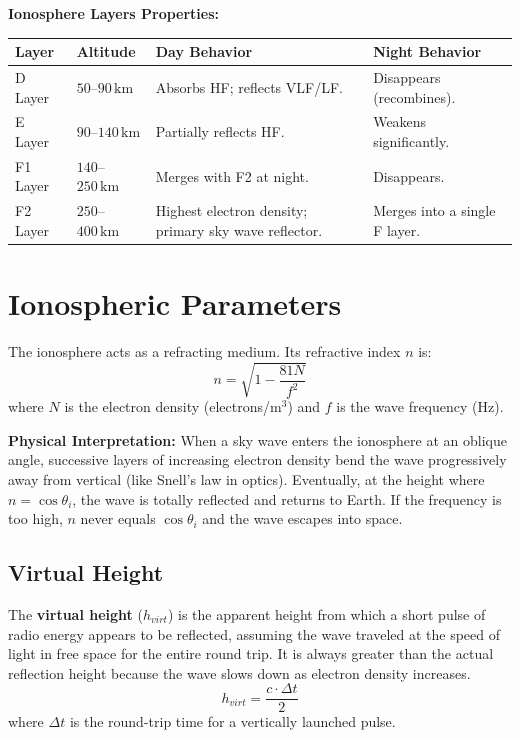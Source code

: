 \documentclass[12pt,a4paper]{article}
\renewcommand{\arraystretch}{1.45}
\begin{document}
\par\noindent
\textbf{Ionosphere Layers Properties:}\par\noindent
{\renewcommand{\arraystretch}{1.45}%
\begin{tabularx}{\linewidth}{|B{1.5cm}|B{2.2cm}|Y|Y|}
\hline
\textbf{Layer} & \textbf{Altitude} & \textbf{Day Behavior} & \textbf{Night Behavior} \\
\hline
D Layer & $50$–$90\,\text{km}$ & Absorbs HF; reflects VLF/LF. & Disappears (recombines). \\
\hline
E Layer & $90$–$140\,\text{km}$ & Partially reflects HF. & Weakens significantly. \\
\hline
F1 Layer & $140$–$250\,\text{km}$ & Merges with F2 at night. & Disappears. \\
\hline
F2 Layer & $250$–$400\,\text{km}$ & Highest electron density; primary sky wave reflector. & Merges into a single F layer. \\
\hline
\end{tabularx}}

\section{Ionospheric Parameters}

The ionosphere acts as a refracting medium. Its refractive index $n$ is:
\[
n = \sqrt{1 - \frac{81 N}{f^2}}
\]
where $N$ is the electron density (electrons/$\text{m}^3$) and $f$ is the wave frequency (Hz).

\textbf{Physical Interpretation:} When a sky wave enters the ionosphere at an oblique angle, successive layers of increasing electron density bend the wave progressively away from vertical (like Snell's law in optics). Eventually, at the height where $n = \cos\theta_i$, the wave is totally reflected and returns to Earth. If the frequency is too high, $n$ never equals $\cos\theta_i$ and the wave escapes into space.

\subsection{Virtual Height}
The \textbf{virtual height} ($h_{virt}$) is the apparent height from which a short pulse of radio energy appears to be reflected, assuming the wave traveled at the speed of light in free space for the entire round trip. It is always greater than the actual reflection height because the wave slows down as electron density increases.
\[
h_{virt} = \frac{c \cdot \Delta t}{2}
\]
where $\Delta t$ is the round-trip time for a vertically launched pulse.
\end{document}
